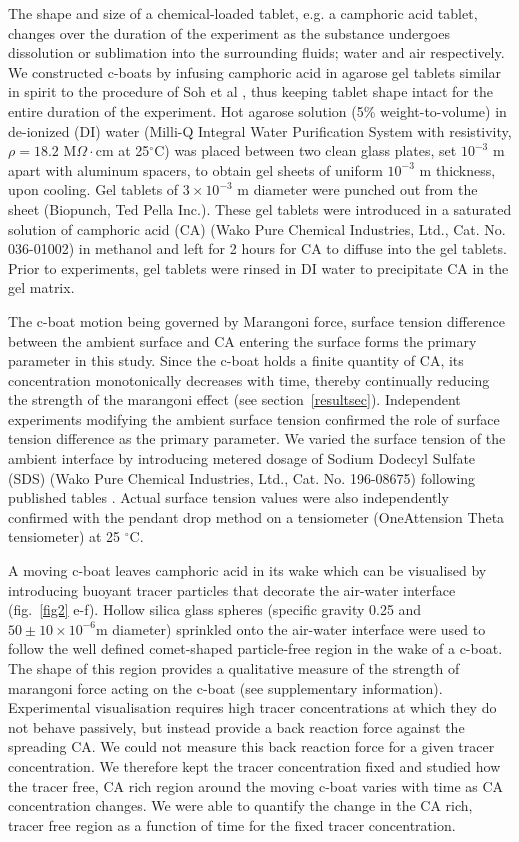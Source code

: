 \documentclass[journal=langd5, manuscript=article, layout=twocolumn]{achemso}
\begin{document}
The shape and size of a chemical-loaded tablet, e.g. a camphoric acid tablet, changes over the duration of the experiment as the substance undergoes dissolution or sublimation into the surrounding fluids; water and air respectively. We constructed c-boats by infusing camphoric acid in agarose gel tablets similar in spirit to the procedure of Soh et al \cite{Soh2008}, thus keeping tablet shape intact for the entire duration of the experiment. Hot agarose solution (5\% weight-to-volume) in de-ionized (DI) water (Milli-Q Integral Water Purification System with resistivity, $\rho=18.2$ M$\Omega\cdot$cm at 25$^{\circ}$C) was placed between two clean glass plates, set $10^{-3}$ m apart with aluminum spacers, to obtain gel sheets of uniform $10^{-3}$ m thickness, upon cooling. Gel tablets of $3 \times 10^{-3}$ m diameter were punched out from the sheet (Biopunch, Ted Pella Inc.). These gel tablets were introduced in a saturated solution of camphoric acid (CA) (Wako Pure Chemical Industries, Ltd., Cat. No. 036-01002) in methanol and left for 2 hours for CA to diffuse into the gel tablets. Prior to experiments, gel tablets were rinsed in DI water to precipitate CA in the gel matrix. 

The c-boat motion being governed by Marangoni force, surface tension difference between the ambient surface and CA entering the surface forms the primary parameter in this study. Since the c-boat holds a finite quantity of CA, its concentration monotonically decreases with time, thereby continually reducing the strength of the marangoni effect (see section~\ref{resultsec}). Independent experiments modifying the ambient surface tension confirmed the role of surface tension difference as the primary parameter. We varied the surface tension of the ambient interface by introducing metered dosage of Sodium Dodecyl Sulfate (SDS) (Wako Pure Chemical Industries, Ltd., Cat. No. 196-08675) following published tables \cite{Mysels1986}. Actual surface tension values were also independently confirmed with the pendant drop method on a tensiometer (OneAttension Theta tensiometer) at 25 $^{\circ}$C.


A moving c-boat leaves camphoric acid in its wake which can be visualised by introducing buoyant tracer particles that decorate the air-water interface (fig.~\ref{fig2} e-f). Hollow silica glass spheres (specific gravity 0.25 and $50 \pm 10 \times 10^{-6}$m diameter) sprinkled onto the air-water interface were used to follow the well defined comet-shaped particle-free region in the wake of a c-boat. The shape of this region provides a qualitative measure of the strength of marangoni force acting on the c-boat (see supplementary information). Experimental visualisation requires high tracer concentrations at which they do not behave passively, but instead provide a back reaction force against the spreading CA. We could not measure this back reaction force for a given tracer concentration. We therefore kept the tracer concentration fixed and studied how the tracer free, CA rich region around the moving c-boat varies with time as CA concentration changes. We were able to quantify the change in the CA rich, tracer free region as a function of time for the fixed tracer concentration.
\end{document}
